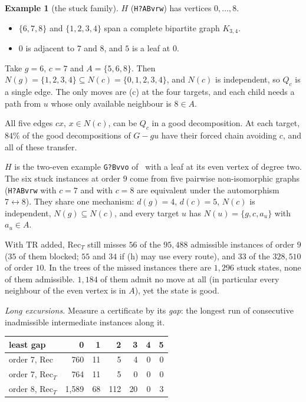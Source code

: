 \documentclass[11pt]{amsart}
\theoremstyle{definition}
\newtheorem{example}[theorem]{Example}
\newcommand{\TR}{\mathrm{TR}}
\begin{document}
\begin{example}[the stuck family]\label{ex:stuck}
$H$ (\texttt{H?ABvrw}) has vertices $0,\dots,8$.
\begin{itemize}
\item $\{6,7,8\}$ and $\{1,2,3,4\}$ span a complete bipartite graph $K_{3,4}$.
\item $0$ is adjacent to $7$ and $8$, and $5$ is a leaf at $0$.
\end{itemize}
Take $g=6$, $c=7$ and $A=\{5,6,8\}$. Then $N(g)=\{1,2,3,4\}\subseteq N(c)=\{0,1,2,3,4\}$, and $N(c)$ is
independent, so $Q_c$ is a single edge. The only moves are (c) at the four targets, and each child
needs a path from $u$ whose only available neighbour is $8\in A$.

All five edges $cx$, $x\in N(c)$, can be $Q_c$ in a good decomposition. At each target, $84\%$ of the
good decompositions of $G-gu$ have their forced chain avoiding $c$, and all of these transfer.

$H$ is the two-even example \texttt{G?Bvvo} of~\cite[\S8]{L1S} with a leaf at its even vertex of
degree two. The six stuck instances at order $9$ come from five pairwise non-isomorphic graphs
(\texttt{H?ABvrw} with $c=7$ and with $c=8$ are equivalent under the automorphism $7\leftrightarrow
8$). They share one mechanism: $d(g)=4$, $d(c)=5$, $N(c)$ is independent, $N(g)\subseteq N(c)$, and every
target $u$ has $N(u)=\{g,c,a_u\}$ with $a_u\in A$.
\end{example}

With $\TR$ added, $\mathrm{Rec}_T$ still misses $56$ of the $95{,}488$ admissible instances of order $9$
($35$ of them blocked; $55$ and $34$ if (h) may use every route), and $33$ of the $328{,}510$ of order
$10$. In the trees of the missed
instances there are $1{,}296$ stuck states, none of them admissible. $1{,}184$ of them admit no move at
all (in particular every neighbour of the even vertex is in $A$), yet the state is good.

\emph{Long excursions.} Measure a certificate by its \emph{gap}: the longest run of consecutive
inadmissible intermediate instances along it.

\begin{center}
\begin{tabular}{lrrrrrr}
\toprule
least gap & 0 & 1 & 2 & 3 & 4 & 5\\
\midrule
order 7, $\mathrm{Rec}$ & 760 & 11 & 5 & 4 & 0 & 0\\
order 7, $\mathrm{Rec}_T$ & 764 & 11 & 5 & 0 & 0 & 0\\
order 8, $\mathrm{Rec}_T$ & 1{,}589 & 68 & 112 & 20 & 0 & 3\\
\bottomrule
\end{tabular}
\end{center}
\end{document}
